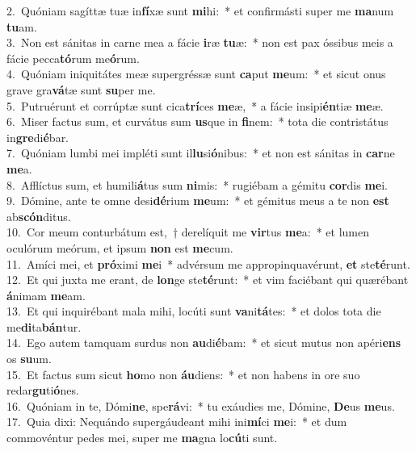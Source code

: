 {2.~}Quóniam sagíttæ tuæ in\textbf{fí}xæ sunt \textbf{mi}hi:~* et confirmásti super me \textbf{ma}num \textbf{tu}am.\\
{3.~}Non est sánitas in carne mea a fácie \textbf{i}ræ \textbf{tu}æ:~* non est pax óssibus meis a fácie pecca\textbf{tó}rum me\textbf{ó}rum.\\
{4.~}Quóniam iniquitátes meæ supergréssæ sunt \textbf{ca}put \textbf{me}um:~* et sicut onus grave gra\textbf{vá}tæ sunt \textbf{su}per me.\\
{5.~}Putruérunt et corrúptæ sunt cica\textbf{trí}ces \textbf{me}æ,~* a fácie insipi\textbf{én}tiæ \textbf{me}æ.\\
{6.~}Miser factus sum, et curvátus sum \textbf{us}que in \textbf{fi}nem:~* tota die contristátus in\textbf{gre}di\textbf{é}bar.\\
{7.~}Quóniam lumbi mei impléti sunt il\textbf{lu}si\textbf{ó}nibus:~* et non est sánitas in \textbf{car}ne \textbf{me}a.\\
{8.~}Afflíctus sum, et humili\textbf{á}tus sum \textbf{ni}mis:~* rugiébam a gémitu \textbf{cor}dis \textbf{me}i.\\
{9.~}Dómine, ante te omne desi\textbf{dé}rium \textbf{me}um:~* et gémitus meus a te non \textbf{est} ab\textbf{scón}ditus.\\
{10.~}Cor meum conturbátum est,~† derelíquit me \textbf{vir}tus \textbf{me}a:~* et lumen oculórum meórum, et ipsum \textbf{non} est \textbf{me}cum.\\
{11.~}Amíci mei, et \textbf{pró}ximi \textbf{me}i~* advérsum me appropinquavérunt, \textbf{et} ste\textbf{té}runt.\\
{12.~}Et qui juxta me erant, de \textbf{lon}ge ste\textbf{té}runt:~* et vim faciébant qui quærébant \textbf{á}nimam \textbf{me}am.\\
{13.~}Et qui inquirébant mala mihi, locúti sunt \textbf{va}ni\textbf{tá}tes:~* et dolos tota die me\textbf{di}ta\textbf{bán}tur.\\
{14.~}Ego autem tamquam surdus non \textbf{au}di\textbf{é}bam:~* et sicut mutus non apéri\textbf{ens} os \textbf{su}um.\\
{15.~}Et factus sum sicut \textbf{ho}mo non \textbf{áu}diens:~* et non habens in ore suo redar\textbf{gu}ti\textbf{ó}nes.\\
{16.~}Quóniam in te, Dómi\textbf{ne}, spe\textbf{rá}vi:~* tu exáudies me, Dómine, \textbf{De}us \textbf{me}us.\\
{17.~}Quia dixi: Nequándo supergáudeant mihi ini\textbf{mí}ci \textbf{me}i:~* et dum commovéntur pedes mei, super me \textbf{ma}gna lo\textbf{cú}ti sunt.\\
